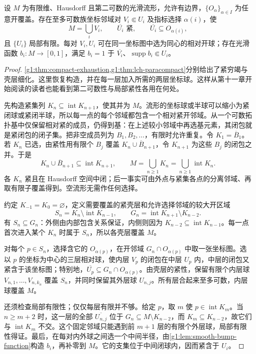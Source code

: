 \begin{lemma}\label{g1:lem:precompact-coordinate-refinement}
	设 \(M\) 为有限维、Hausdorff 且第二可数的光滑流形，允许有边界，\(\{O_\alpha\}_{\alpha\in I}\) 为任意开覆盖。存在至多可数族坐标邻域对 \(V_i\Subset U_i\) 及指标选择 \(\alpha(i)\)，使
	\[
		M=\bigcup_iV_i,\qquad
		\overline{U_i}\text{ 紧},\qquad
		\overline{U_i}\subseteq O_{\alpha(i)},
	\]
	且 \(\{U_i\}\) 局部有限。每对 \(V_i,U_i\) 可在同一坐标图中选为同心的相对开球；存在光滑函数 \(b_i:M\to[0,1]\)，满足 \(b_i=1\) 于 \(\overline{V_i}\)、\(\operatorname{supp}b_i\Subset U_i\)。
\end{lemma}
\begin{proof}
	\cref{g1:thm:compact-exhaustion,g1:thm:lch-paracompact}分别给出了紧穷竭与壳层细化。这里恢复构造，并在每一层加入所需的两层坐标球。这样从第十一章开始阅读的读者也能看到第二可数性与局部紧性各用在何处。

	先构造紧集列 \(K_n\subseteq\operatorname{int}K_{n+1}\)，使其并为 \(M\)。流形的坐标球或半球可以缩小为紧闭球或紧闭半球，所以每一点的每个邻域都包含一个相对紧开邻域。从一个可数拓扑基中仅保留相对紧的成员，仍得到基：在上述较小邻域中再选基元素，其闭包就是紧闭包的闭子集。把非空成员列为 \(B_1,B_2,\ldots\)，有限时允许重复。令 \(K_1=\overline B_1\)。若 \(K_n\) 已选，由紧性用有限个 \(B_j\) 覆盖 \(K_n\cup\overline B_{n+1}\)，令 \(K_{n+1}\) 为这些 \(B_j\) 的闭包之并。于是
	\[
		K_n\cup\overline B_{n+1}\subseteq\operatorname{int}K_{n+1},
		\qquad
		M=\bigcup_{n\ge1}K_n=\bigcup_{n\ge1}\operatorname{int}K_n.
	\]
	各 \(K_n\) 紧且在 Hausdorff 空间中闭；后一事实可由外点与紧集各点的分离邻域、再取有限子覆盖得到。空流形无需作任何选择。

	约定 \(K_{-1}=K_0=\varnothing\)，定义需要覆盖的紧壳层和允许选择邻域的较大开区域
	\[
		S_n=K_n\setminus\operatorname{int}K_{n-1},
		\qquad
		G_n=\operatorname{int}K_{n+1}\setminus K_{n-2}.
	\]
	有 \(S_n\subseteq G_n\)：外侧由内部包含关系保证，内侧则因为 \(K_{n-2}\subseteq\operatorname{int}K_{n-1}\)。每一点首次进入某个 \(K_n\) 时属于 \(S_n\)，所以各壳层覆盖 \(M\)。

	对每个 \(p\in S_n\)，选择含它的 \(O_{\alpha(p)}\)，在开邻域 \(G_n\cap O_{\alpha(p)}\) 中取一张坐标图。选以 \(p\) 的坐标为中心的三层相对球，使内层 \(V_p\) 的闭包在中层 \(U_p\) 内，中层的闭包又紧含于该坐标图；特别地，\(\overline{U_p}\subseteq G_n\cap O_{\alpha(p)}\)。由壳层的紧性，保留有限个内层球 \(V_{n,1},\ldots,V_{n,k_n}\) 覆盖 \(S_n\)，并同时保留其外层球 \(U_{n,j}\)。所有层合起来至多可数，内层球覆盖 \(M\)。

	还须检查局部有限性；仅仅每层有限并不够。给定 \(p\)，取 \(m\) 使 \(p\in\operatorname{int}K_m\)。当 \(n\ge m+2\) 时，这一层的全部 \(\overline{U_{n,j}}\) 位于 \(G_n\subseteq M\setminus K_{n-2}\)，而 \(K_m\subseteq K_{n-2}\)，故它们与 \(\operatorname{int}K_m\) 不交。这个固定邻域只能遇到前 \(m+1\) 层的有限个外层球，局部有限性得证。最后，在每对内外球之间选一个中间半径，由\cref{g1:lem:smooth-bump-function}构造 \(b_i\)，再补零到 \(M\)。它的支集位于中间闭球内，因而紧含于 \(U_i\)。
\end{proof}

